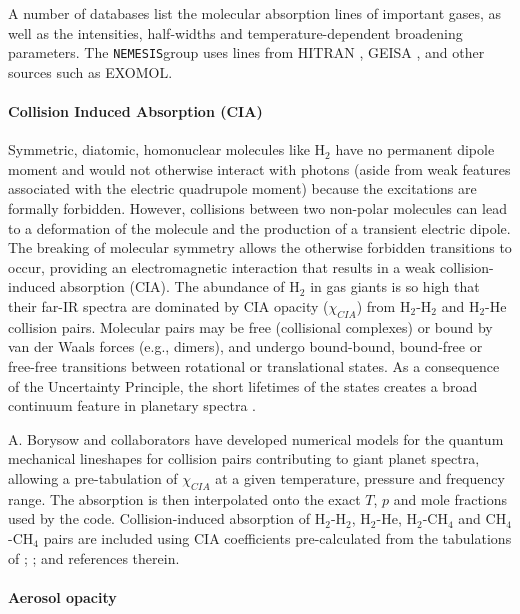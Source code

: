 \documentclass[final,5p,times,twocolumn,authoryear]{elsarticle}
\begin{document}
A number of databases list the molecular absorption lines of important gases, as well as the intensities, half-widths and temperature-dependent broadening parameters.  The \verb#NEMESIS#group uses lines from HITRAN \citep{05rothman, 13rothman}, GEISA \citep{05geisa}, and other sources such as EXOMOL.

\paragraph{Collision Induced Absorption (CIA)}

Symmetric, diatomic, homonuclear molecules like H$_2$ have no permanent dipole moment and would not otherwise interact with photons (aside from weak features associated with the electric quadrupole moment) because the excitations are formally forbidden.  However, collisions between two non-polar molecules can lead to a deformation of the molecule and the production of a transient electric dipole.  The breaking of molecular symmetry allows the otherwise forbidden transitions to occur, providing an electromagnetic interaction that results in a weak collision-induced absorption (CIA).  The abundance of H$_2$ in gas giants is so high that their far-IR spectra are dominated by CIA opacity ($\chi_{CIA}$) from H$_2$-H$_2$ and H$_2$-He collision pairs.   Molecular pairs may be free (collisional complexes) or bound by van der Waals forces (e.g., dimers), and undergo bound-bound, bound-free or free-free transitions between rotational or translational states.  As a consequence of the Uncertainty Principle, the short lifetimes of the states creates a broad continuum feature in planetary spectra \citep{03irwbook}.

A. Borysow and collaborators have developed numerical models for the quantum mechanical lineshapes for collision pairs contributing to giant planet spectra, allowing a pre-tabulation of $\chi_{CIA}$ at a given temperature, pressure and frequency range.  The absorption is then interpolated onto the exact $T$, $p$ and mole fractions used by the code. Collision-induced absorption of H$_{2}$-H$_{2}$, H$_{2}$-He, H$_{2}$-CH$_{4}$ and CH$_{4}$-CH$_{4}$ pairs are included using CIA coefficients pre-calculated from the tabulations of \citet{91borysow, 93borysow, 07orton}; \citet{88borysow}; \citet{86borysow, 87borysow} and references therein.

\paragraph{Aerosol opacity}
\end{document}
